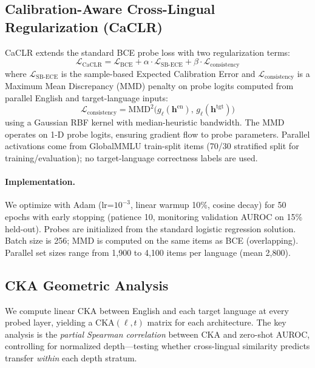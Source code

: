 \documentclass[11pt,a4paper]{article}
\newcommand{\caclr}{CaCLR}
\begin{document}
\subsection{Calibration-Aware Cross-Lingual Regularization (\caclr{})}
\label{sec:caclr}

\caclr{} extends the standard BCE probe loss with two regularization terms:
\begin{equation}
\mathcal{L}_{\text{CaCLR}} = \mathcal{L}_{\text{BCE}} + \alpha \cdot \mathcal{L}_{\text{SB-ECE}} + \beta \cdot \mathcal{L}_{\text{consistency}}
\end{equation}
where $\mathcal{L}_{\text{SB-ECE}}$ is the sample-based Expected Calibration Error and $\mathcal{L}_{\text{consistency}}$ is a Maximum Mean Discrepancy (MMD) penalty on probe logits computed from parallel English and target-language inputs:
\begin{equation}
\mathcal{L}_{\text{consistency}} = \text{MMD}^2\!\big(g_\ell(\mathbf{h}^{\text{en}}),\, g_\ell(\mathbf{h}^{\text{tgt}})\big)
\end{equation}
using a Gaussian RBF kernel with median-heuristic bandwidth.
The MMD operates on 1-D probe logits, ensuring gradient flow to probe parameters.
Parallel activations come from GlobalMMLU train-split items (70/30 stratified split for training/evaluation); no target-language correctness labels are used.

\paragraph{Implementation.}
We optimize with Adam (lr=$10^{-3}$, linear warmup 10\%, cosine decay) for 50 epochs with early stopping (patience 10, monitoring validation AUROC on 15\% held-out).
Probes are initialized from the standard logistic regression solution.
Batch size is 256; MMD is computed on the same items as BCE (overlapping).
Parallel set sizes range from 1,900 to 4,100 items per language (mean 2,800).

\subsection{CKA Geometric Analysis}

We compute linear CKA between English and each target language at every probed layer, yielding a $\text{CKA}(\ell, t)$ matrix for each architecture.
The key analysis is the \emph{partial Spearman correlation} between CKA and zero-shot AUROC, controlling for normalized depth---testing whether cross-lingual similarity predicts transfer \emph{within} each depth stratum.
\end{document}
